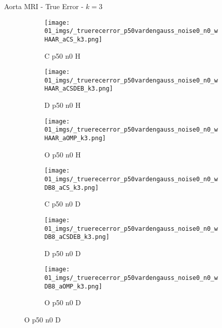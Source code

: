 \begin{frame}{Aorta MRI - True Error - $k=3$}{}
\begin{figure}
\begin{subfigure}{0.13\textwidth}
\texttt{[image: 01\_imgs/\_truerecerror\_p50vardengauss\_noise0\_n0\_wHAAR\_aCS\_k3.png]}
\caption*{\tiny C p50 n0 H}
\end{subfigure}
\begin{subfigure}{0.13\textwidth}
\texttt{[image: 01\_imgs/\_truerecerror\_p50vardengauss\_noise0\_n0\_wHAAR\_aCSDEB\_k3.png]}
\caption*{\tiny D p50 n0 H}
\end{subfigure}
\begin{subfigure}{0.13\textwidth}
\texttt{[image: 01\_imgs/\_truerecerror\_p50vardengauss\_noise0\_n0\_wHAAR\_aOMP\_k3.png]}
\caption*{\tiny O p50 n0 H}
\end{subfigure}
\begin{subfigure}{0.13\textwidth}
\texttt{[image: 01\_imgs/\_truerecerror\_p50vardengauss\_noise0\_n0\_wDB8\_aCS\_k3.png]}
\caption*{\tiny C p50 n0 D}
\end{subfigure}
\begin{subfigure}{0.13\textwidth}
\texttt{[image: 01\_imgs/\_truerecerror\_p50vardengauss\_noise0\_n0\_wDB8\_aCSDEB\_k3.png]}
\caption*{\tiny D p50 n0 D}
\end{subfigure}
\begin{subfigure}{0.13\textwidth}
\texttt{[image: 01\_imgs/\_truerecerror\_p50vardengauss\_noise0\_n0\_wDB8\_aOMP\_k3.png]}
\caption*{\tiny O p50 n0 D}
\end{subfigure}

\vspace{5pt}


\end{figure}
\end{frame}
